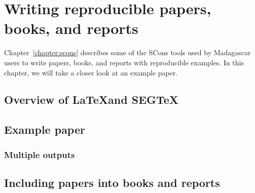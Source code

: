 \chapter{Writing reproducible papers, books, and reports}

Chapter~\ref{chapter:scons} describes some of the SCons tools used by
Madagascar users to write papers, books, and reports with reproducible
examples. In this chapter, we will take a closer look at an example paper.

\section{Overview of \LaTeX and SEG\TeX}

\section{Example paper}

\subsection{Multiple outputs}

\section{Including papers into books and reports}

